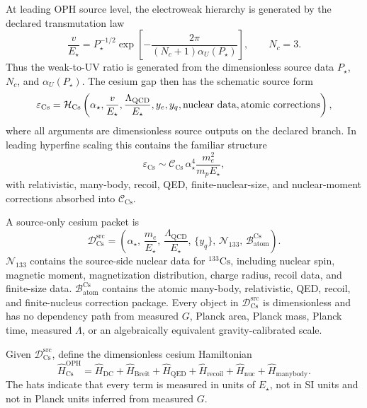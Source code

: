 At leading OPH source level, the electroweak hierarchy is generated by the declared
transmutation law
\[
\frac{v}{E_\star}
=
P_\star^{-1/2}
\exp\!\left[
-\frac{2\pi}{(N_c+1)\alpha_U(P_\star)}
\right],
\qquad
N_c=3.
\]
Thus the weak-to-UV ratio is generated from the dimensionless source data
\(P_\star\), \(N_c\), and \(\alpha_U(P_\star)\). The cesium gap then has the schematic
source form
\[
\varepsilon_{\mathrm{Cs}}
=
\mathcal H_{\mathrm{Cs}}
\left(
\alpha_\star,
\frac{v}{E_\star},
\frac{\Lambda_{\mathrm{QCD}}}{E_\star},
y_e,
y_q,
\hbox{nuclear data},
\hbox{atomic corrections}
\right),
\]
where all arguments are dimensionless source outputs on the declared branch. In leading
hyperfine scaling this contains the familiar structure
\[
\varepsilon_{\mathrm{Cs}}
\sim
\mathcal C_{\mathrm{Cs}}\,
\alpha_\star^4
\frac{m_e^2}{m_pE_\star},
\]
with relativistic, many-body, recoil, QED, finite-nuclear-size, and nuclear-moment corrections
absorbed into \(\mathcal C_{\mathrm{Cs}}\).

\begin{definition}\label{def:cs-source-packet}
A source-only cesium packet is
\[
\mathcal D_{\mathrm{Cs}}^{\mathrm{src}}
=
\left(
\alpha_\star,\,
\frac{m_e}{E_\star},\,
\frac{\Lambda_{\mathrm{QCD}}}{E_\star},\,
\{y_q\},\,
\mathcal N_{133},\,
\mathcal B_{\mathrm{atom}}^{\mathrm{Cs}}
\right).
\]
\(\mathcal N_{133}\) contains the source-side nuclear data for \({}^{133}\mathrm{Cs}\), including
nuclear spin, magnetic moment, magnetization distribution, charge radius, recoil data, and
finite-size data. \(\mathcal B_{\mathrm{atom}}^{\mathrm{Cs}}\) contains the atomic many-body,
relativistic, QED, recoil, and finite-nucleus correction package. Every object in
\(\mathcal D_{\mathrm{Cs}}^{\mathrm{src}}\) is dimensionless and has no dependency path from
measured \(G\), Planck area, Planck mass, Planck time, measured \(\Lambda\), or an algebraically
equivalent gravity-calibrated scale.
\end{definition}

\begin{definition}\label{def:oph-cs-hamiltonian}
Given \(\mathcal D_{\mathrm{Cs}}^{\mathrm{src}}\), define the dimensionless cesium Hamiltonian
\[
\widehat H_{\mathrm{Cs}}^{\mathrm{OPH}}
=
\widehat H_{\mathrm{DC}}
+
\widehat H_{\mathrm{Breit}}
+
\widehat H_{\mathrm{QED}}
+
\widehat H_{\mathrm{recoil}}
+
\widehat H_{\mathrm{nuc}}
+
\widehat H_{\mathrm{manybody}}.
\]
The hats indicate that every term is measured in units of \(E_\star\), not in SI units and not in
Planck units inferred from measured \(G\).
\end{definition}


